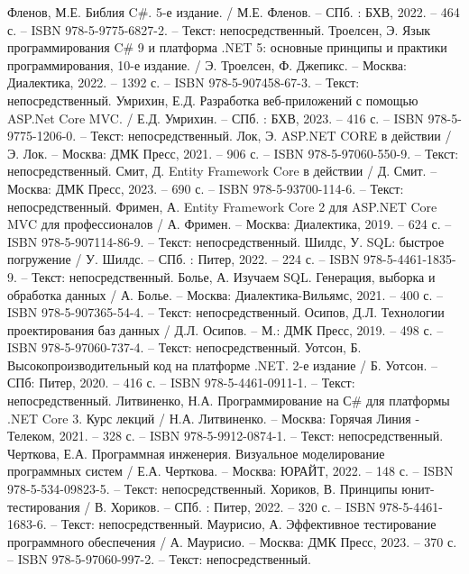 
\begin{thebibliography}{9}

     Фленов, М.Е. Библия C\#. 5-е издание. / М.Е. Фленов. – СПб. : БХВ, 2022. – 464 с. – ISBN 978-5-9775-6827-2. – Текст: непосредственный.
     Троелсен, Э. Язык программирования C\# 9 и платформа .NET 5: основные принципы и практики программирования, 10-е издание. / Э. Троелсен, Ф. Джепикс. – Москва: Диалектика, 2022. – 1392 с. – ISBN 978-5-907458-67-3. – Текст: непосредственный.
     Умрихин, Е.Д. Разработка веб-приложений с помощью ASP.Net Core MVC. / Е.Д. Умрихин. – СПб. : БХВ, 2023. – 416 с. – ISBN 978-5-9775-1206-0. – Текст: непосредственный.
    	Лок, Э. ASP.NET CORE в действии / Э. Лок. – Москва: ДМК Пресс, 2021. – 906 с. – ISBN 978-5-97060-550-9. – Текст: непосредственный.
		Смит, Д. Entity Framework Core в действии / Д. Смит. – Москва: ДМК Пресс, 2023. – 690 с. – ISBN 978-5-93700-114-6. – Текст: непосредственный.
		Фримен, А. Entity Framework Core 2 для ASP.NET Core MVC для профессионалов / А. Фримен. – Москва: Диалектика, 2019. – 624 с. – ISBN 978-5-907114-86-9. – Текст: непосредственный.
		Шилдс, У. SQL: быстрое погружение / У. Шилдс. – СПб. : Питер, 2022. – 224 с. – ISBN 978-5-4461-1835-9. – Текст: непосредственный.
		Болье, А. Изучаем SQL. Генерация, выборка и обработка данных / А. Болье. – Москва: Диалектика-Вильямс, 2021. – 400 с. – ISBN 978-5-907365-54-4. – Текст: непосредственный.
		Осипов, Д.Л. Технологии проектирования баз данных / Д.Л. Осипов. – М.: ДМК Пресс, 2019. – 498 с. – ISBN 978-5-97060-737-4. – Текст: непосредственный.
		Уотсон, Б. Высокопроизводительный код на платформе .NET. 2-е издание / Б. Уотсон. – СПб: Питер, 2020. – 416 с. – ISBN 978-5-4461-0911-1. – Текст: непосредственный.
		Литвиненко, Н.А. Программирование на С\# для платформы .NET Core 3. Курс лекций / Н.А. Литвиненко. – Москва: Горячая Линия - Телеком, 2021. – 328 с. – ISBN 978-5-9912-0874-1. – Текст: непосредственный.
		Черткова, Е.А. Программная инженерия. Визуальное моделирование программных систем / Е.А. Черткова. – Москва: ЮРАЙТ, 2022. – 148 с. – ISBN 978-5-534-09823-5. – Текст: непосредственный.
		Хориков, В. Принципы юнит-тестирования / В. Хориков. – СПб. : Питер, 2022. – 320 с. – ISBN 978-5-4461-1683-6. – Текст: непосредственный.
	 Маурисио, А. Эффективное тестирование программного обеспечения / А. Маурисио. – Москва: ДМК Пресс, 2023. – 370 с. – ISBN 978-5-97060-997-2. – Текст: непосредственный.

\end{thebibliography}
